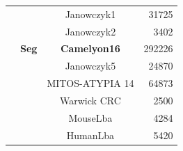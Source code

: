 \documentclass[conference]{IEEEtran}
\begin{document}
\begin{table}[]
{\begin{tabular}{|c|c|cr|}
                                                                  &                                  & Janowczyk1 \cite{janowczyk2016deep}                                                                                                                            & 31725                                                   \\
                                                                  &                                  & Janowczyk2 \cite{janowczyk2016deep}                                                                                                                            & 3402                                                    \\
                                                                  & \multirow{-3}{*}{\textbf{Seg}}   & { \textbf{Camelyon16 \cite{bejnordi2017diagnostic}}}                                                                                       & 292226                                                  \\ \cline{2-4} 
                                                                  &                                  & Janowczyk5 \cite{janowczyk2016deep}                                                                                                                            & 24870                                                   \\
                                                                  &                                  & MITOS-ATYPIA 14 \cite{roux2014mitos}                                                                                                                           & 64873                                                   \\
                                                                  &                                  & Warwick CRC \cite{sirinukunwattana2016locality}                                                                                                                & 2500                                                    \\
                                                                  &                                  & MouseLba \cite{mormont2018comparison}                                                                                                                          & 4284                                                    \\
                                                                  &                                  & HumanLba \cite{mormont2018comparison}                                                                                                                          & 5420                                                    \\

\end{tabular}}
\end{table}
\end{document}
